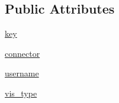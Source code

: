 \subsection*{Public Attributes}
\begin{DoxyCompactItemize}
\item 
\mbox{\hyperlink{class_bridges_1_1_bridges_1_1_bridges_aa9cbb19b029f0c5257f4a605e8de1097}{key}}
\item 
\mbox{\hyperlink{class_bridges_1_1_bridges_1_1_bridges_a0101c37e64215a6ef4923bd8fc4339e1}{connector}}
\item 
\mbox{\hyperlink{class_bridges_1_1_bridges_1_1_bridges_a65b7ea93a38533a0f875e5f3e5d80caf}{username}}
\item 
\mbox{\hyperlink{class_bridges_1_1_bridges_1_1_bridges_aea9edc834f1fc1dcfb1ca53d82eba33a}{vis\+\_\+type}}
\end{DoxyCompactItemize}

